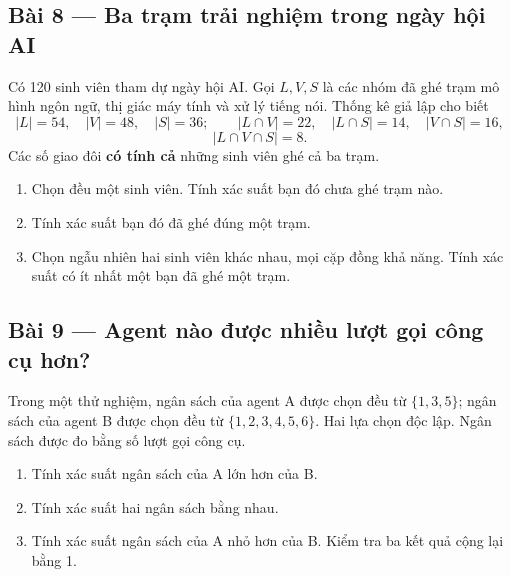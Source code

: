 \documentclass[11pt,a4paper]{article}
\begin{document}
\par\medskip

\noindent\begin{minipage}{\linewidth}
\subsection*{Bài 8 --- Ba trạm trải nghiệm trong ngày hội AI}

Có 120 sinh viên tham dự ngày hội AI. Gọi \(L,V,S\) là các nhóm đã ghé trạm mô hình ngôn ngữ, thị giác máy tính và xử lý tiếng nói. Thống kê giả lập cho biết
\[
|L|=54,\quad |V|=48,\quad |S|=36;
\qquad |L\cap V|=22,\quad |L\cap S|=14,\quad |V\cap S|=16,
\]
\[|L\cap V\cap S|=8.\]
Các số giao đôi \textbf{có tính cả} những sinh viên ghé cả ba trạm.

\begin{enumerate}[label=\alph*)]
\item Chọn đều một sinh viên. Tính xác suất bạn đó chưa ghé trạm nào.
\item Tính xác suất bạn đó đã ghé đúng một trạm.
\item Chọn ngẫu nhiên hai sinh viên khác nhau, mọi cặp đồng khả năng. Tính xác suất có ít nhất một bạn đã ghé một trạm.
\end{enumerate}

\end{minipage}\par

\par\medskip

\noindent\begin{minipage}{\linewidth}
\subsection*{Bài 9 --- Agent nào được nhiều lượt gọi công cụ hơn?}

Trong một thử nghiệm, ngân sách của agent A được chọn đều từ \(\{1,3,5\}\); ngân sách của agent B được chọn đều từ \(\{1,2,3,4,5,6\}\). Hai lựa chọn độc lập. Ngân sách được đo bằng số lượt gọi công cụ.

\begin{enumerate}[label=\alph*)]
\item Tính xác suất ngân sách của A lớn hơn của B.
\item Tính xác suất hai ngân sách bằng nhau.
\item Tính xác suất ngân sách của A nhỏ hơn của B. Kiểm tra ba kết quả cộng lại bằng 1.
\end{enumerate}

\end{minipage}\par
\end{document}
